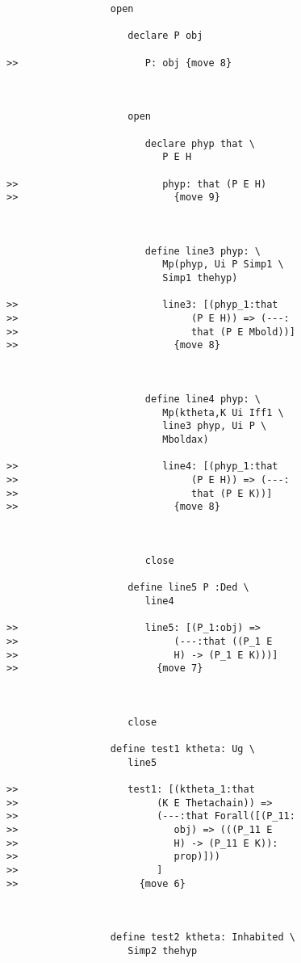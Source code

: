 \documentclass[12pt]{article}
\begin{document}
\begin{verbatim}
                  open

                     declare P obj

>>                      P: obj {move 8}



                     open

                        declare phyp that \
                           P E H

>>                         phyp: that (P E H)
>>                           {move 9}



                        define line3 phyp: \
                           Mp(phyp, Ui P Simp1 \
                           Simp1 thehyp)

>>                         line3: [(phyp_1:that
>>                              (P E H)) => (---:
>>                              that (P E Mbold))]
>>                           {move 8}



                        define line4 phyp: \
                           Mp(ktheta,K Ui Iff1 \
                           line3 phyp, Ui P \
                           Mboldax)

>>                         line4: [(phyp_1:that
>>                              (P E H)) => (---:
>>                              that (P E K))]
>>                           {move 8}



                        close

                     define line5 P :Ded \
                        line4

>>                      line5: [(P_1:obj) =>
>>                           (---:that ((P_1 E
>>                           H) -> (P_1 E K)))]
>>                        {move 7}



                     close

                  define test1 ktheta: Ug \
                     line5

>>                   test1: [(ktheta_1:that
>>                        (K E Thetachain)) =>
>>                        (---:that Forall([(P_11:
>>                           obj) => (((P_11 E
>>                           H) -> (P_11 E K)):
>>                           prop)]))
>>                        ]
>>                     {move 6}



                  define test2 ktheta: Inhabited \
                     Simp2 thehyp


\end{verbatim}
\end{document}

